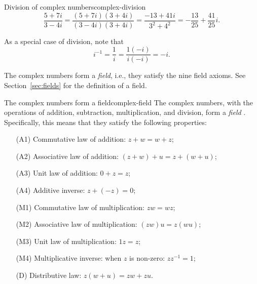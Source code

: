 \begin{example}{Division of complex numbers}{complex-division}
  \begin{equation*}
    \frac{5+7i}{3-4i}
    = \frac{(5+7i)(3+4i)}{(3-4i)(3+4i)}
    = \frac{-13+41i}{3^2+4^2}
    = -\frac{13}{25} + \frac{41}{25}i.
  \end{equation*}
\end{example}

As a special case of division, note that
\begin{equation*}
  i^{-1} = \frac{1}{i} = \frac{1(-i)}{i(-i)} = -i.
\end{equation*}

The complex numbers form a {\em field}, i.e., they satisfy the nine
field axioms. See Section~\ref{sec:fields} for the definition of a
field.

\begin{proposition}{The complex numbers form a field}{complex-field}
  The complex numbers, with the operations of addition, subtraction,
  multiplication, and division, form a {\em field}%
  . Specifically,
  this means that they satisfy the following properties:
  \begin{itemize}
  \item[(A1)] {Commutative law of addition:} $z+w=w+z$;
  \item[(A2)] {Associative law of addition:} $(z+w)+u = z+(w+u)$;
  \item[(A3)] {Unit law of addition:} $0+z = z$;
  \item[(A4)] {Additive inverse:} $z+(-z)=0$;
  \item[(M1)] {Commutative law of multiplication:} $zw=wz$;
  \item[(M2)] {Associative law of multiplication:} $(zw)u=z(wu)$;
  \item[(M3)] {Unit law of multiplication:} $1z=z$;
  \item[(M4)] {Multiplicative inverse:} when $z$ is non-zero: $zz^{-1}=1$;
  \item[(D)] {Distributive law:} $z(w+u)=zw+zu$.
  \end{itemize}
\end{proposition}


